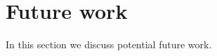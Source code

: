 \section{Future work}\label{sec:futurework}
In this section we discuss potential future work.
\begin{comment}
\subsection{Encapsulation}
The biggest limitation of our approach is the inability to model visibility restrictions. For example, the absence
of support for private/protected methods in Java 8 interfaces forces all
members of interfaces to be public, including static methods. Since we use
abstract methods to encode state, our state is always all public. Still, because 
the state can only be accessed by methods, it 
is impossible for the user to know if a certain method maps directly to a field
or if it has a default implementation.  If the user wants a constructor that
does not directly maps to the fields, (as for secondary constructors in Scala)
he can simply define its own \Q@of@ method and delegate on the generated one:
\begin{lstlisting}
@Obj interface Point {  int x(); int y();
    static Point of(int val){return Point.of(val,val);} }
\end{lstlisting}
However, the generated \Q@of@ method would also be present and public.  If a
future version of Java was to support \emph{static private methods in
  interfaces} we could extend our code generation to handle also encapsulation.
  
However, interfaces as a whole can have public or 
package private (java default) visibility.

We can add a second annotation \Q!@Exposed!  that leverages on this edge: An
interface without exposed works as usual, but if any method of a public \mixin
interface is annotated with \Q!@Exposed!, we can apply a translation where a new
(package private) interface type is introduced, and the original interface become
just a facade.  For example:
\begin{lstlisting}
@Obj public interface Person{
  void name(String val);
  @Exposed default void rename(String newName){ if(/*valid name*/){ this.name(val);}}
  @Exposed String name();
  @Exposed static Person from(String val){ if(/*valid name*/){return Person.of(val);}
    throw /*invalid name*/}  }
\end{lstlisting}
becomes
\begin{lstlisting}
public interface Person{
  void rename(String newName)
  String name();
  static Person from(String val){ return Person$.from(val);} }
  

\end{comment}
